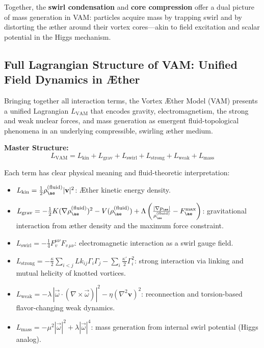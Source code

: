 \documentclass[a4paper,12pt]{article}
\begin{document}
\medskip
\noindent
Together, the \textbf{swirl condensation} and \textbf{core compression} offer a dual picture of mass generation in VAM: particles acquire mass by trapping swirl and by distorting the æther around their vortex cores—akin to field excitation and scalar potential in the Higgs mechanism.



\subsection{Full Lagrangian Structure of VAM: Unified Field Dynamics in Æther}

Bringing together all interaction terms, the Vortex Æther Model (VAM) presents a unified Lagrangian \( L_{\text{VAM}} \) that encodes gravity, electromagnetism, the strong and weak nuclear forces, and mass generation as emergent fluid-topological phenomena in an underlying compressible, swirling æther medium.

\vspace{1em}
\noindent
\textbf{Master Structure:}
\begin{equation}
\boxed{
L_{\text{VAM}} = L_{\text{kin}} + L_{\text{grav}} + L_{\text{swirl}} + L_{\text{strong}} + L_{\text{weak}} + L_{\text{mass}}
}
\end{equation}

\noindent
Each term has clear physical meaning and fluid-theoretic interpretation:
\begin{itemize}
    \item \( L_{\text{kin}} = \tfrac{1}{2} \rho_{\ae}^{(\text{fluid})} |\mathbf{v}|^2 \): Æther kinetic energy density.

    \item \( L_{\text{grav}} = -\tfrac{1}{2} K (\nabla \rho_{\ae}^{(\text{fluid})})^2 - V(\rho_{\ae}^{(\text{fluid})}) + \Lambda\left(\frac{|\nabla p_{\ae}|}{\rho_{\ae}^{(\text{fluid})}} - F^{\max}_{\ae} \right) \): gravitational interaction from æther density and the maximum force constraint.

    \item \( L_{\text{swirl}} = -\tfrac{1}{4} F^{\mu\nu}_{v} F_{v\,\mu\nu} \): electromagnetic interaction as a swirl gauge field.

    \item \( L_{\text{strong}} = -\tfrac{\kappa}{2} \sum_{i<j} Lk_{ij} \Gamma_i \Gamma_j - \sum_i \tfrac{\kappa'}{2} \Gamma_i^2 \): strong interaction via linking and mutual helicity of knotted vortices.

    \item \( L_{\text{weak}} = -\lambda \, \left|\vec{\omega} \cdot (\nabla \times \vec{\omega}) \right|^2 - \eta (\nabla^2 \mathbf{v})^2 \): reconnection and torsion-based flavor-changing weak dynamics.

    \item \( L_{\text{mass}} = -\mu^2 |\vec{\omega}|^2 + \lambda |\vec{\omega}|^4 \): mass generation from internal swirl potential (Higgs analog).
\end{itemize}
\end{document}
